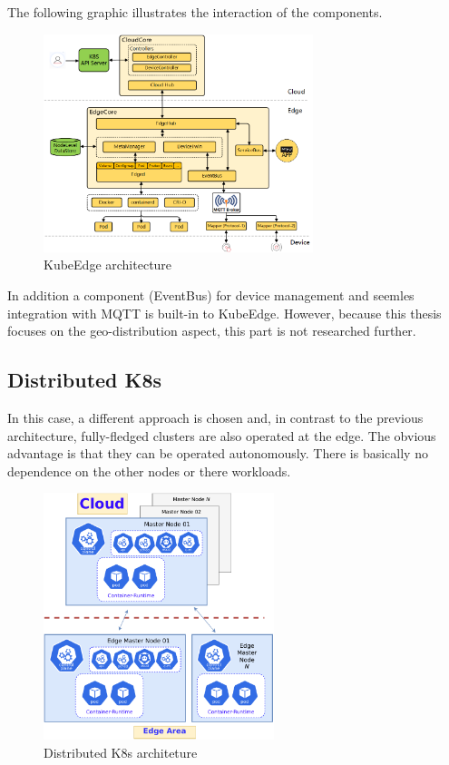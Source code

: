 \documentclass[MSC,Master,english]{twbook}%
\begin{document}
The following graphic illustrates the interaction of the components. 
\begin{figure}[ht]
    \centering
    \includegraphics[width=0.70\textwidth]{PICs/kubeedge-arch.png}
    \caption{KubeEdge architecture\cite{ke-docs-why}}
    \label{fig:ke-architecture}
\end{figure}

In addition a component (EventBus) for device management and seemles integration with \ac{MQTT} is built-in to KubeEdge\cite{hal-kubeedge}. However, because this thesis focuses on the geo-distribution aspect, this part is not researched further.


\subsection{Distributed K8s}
\label{sec:disk8s}
In this case, a different approach is chosen and, in contrast to the previous architecture, fully-fledged clusters are also operated at the edge. The obvious advantage is that they can be operated autonomously. There is basically no dependence on the other nodes or there workloads.

\begin{figure}[ht]
    \centering
    \includegraphics[width=0.60\textwidth]{PICs/drawio/distributed-k8s.drawio.pdf}
    \caption{Distributed \ac{K8s} architeture}
    \label{fig:distributed-k8s}
\end{figure}
\end{document}
